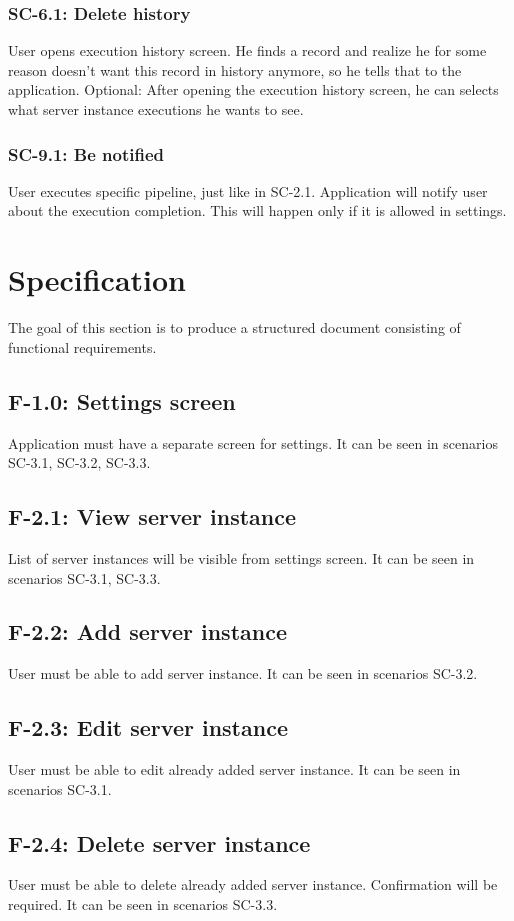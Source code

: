 \subsubsection*{SC-6.1: Delete history}
User opens execution history screen. He finds a record and realize he for some reason doesn't want this record in history anymore, so he tells that to the application. Optional: After opening the execution history screen, he can selects what server instance executions he wants to see.
\subsubsection*{SC-9.1: Be notified}
User executes specific pipeline, just like in SC-2.1. Application will notify user about the execution completion. This will happen only if it is allowed in settings.

\section{Specification}
The goal of this section is to produce a structured document consisting of functional requirements.
\subsection*{F-1.0: Settings screen}
Application must have a separate screen for settings. It can be seen in scenarios SC-3.1, SC-3.2, SC-3.3.
\subsection*{F-2.1: View server instance}
List of server instances will be visible from settings screen. It can be seen in scenarios SC-3.1, SC-3.3.
\subsection*{F-2.2: Add server instance}
User must be able to add server instance. It can be seen in scenarios SC-3.2.
\subsection*{F-2.3: Edit server instance}
User must be able to edit already added server instance. It can be seen in scenarios SC-3.1.
\subsection*{F-2.4: Delete server instance}
User must be able to delete already added server instance. Confirmation will be required. It can be seen in scenarios SC-3.3.

